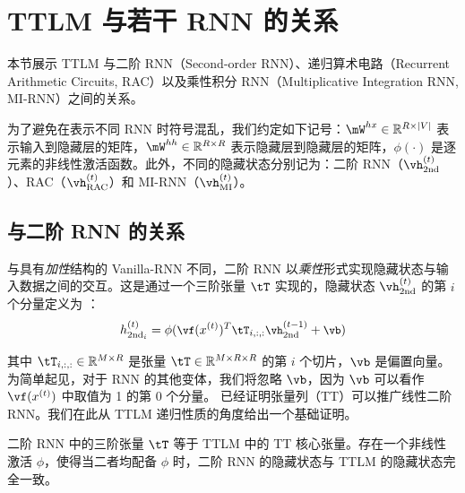 \section{TTLM 与若干 RNN 的关系}
\label{sec: TTLM generalization}

本节展示 TTLM 与二阶 RNN（Second-order RNN）、递归算术电路（Recurrent Arithmetic Circuits, RAC）以及乘性积分 RNN（Multiplicative Integration RNN, MI-RNN）之间的关系。

为了避免在表示不同 RNN 时符号混乱，我们约定如下记号：$\mW^{hx} \in \mathbb{R}^{R \times |V|}$ 表示输入到隐藏层的矩阵，$\mW^{hh} \in \mathbb{R}^{R \times R}$ 表示隐藏层到隐藏层的矩阵，$\phi(\cdot)$ 是逐元素的非线性激活函数。此外，不同的隐藏状态分别记为：二阶 RNN（$\vh^{(t)}_\textrm{2nd}$）、RAC（$\vh^{(t)}_\textrm{RAC}$）和 MI-RNN（$\vh^{(t)}_\textrm{MI}$）。


\subsection{与二阶 RNN 的关系}
\label{appendix: seecond}

与具有\textit{加性}结构的 Vanilla-RNN \citep{mikolov2012context} 不同，二阶 RNN 以\textit{乘性}形式实现隐藏状态与输入数据之间的交互。这是通过一个三阶张量 $\tT$ 实现的，隐藏状态 $\vh^{(t)}_\textrm{2nd}$ 的第 $i$ 个分量定义为 \citep{hochreiter1997long, maupome-meurs-2020-language}：
%
\begin{equation} \small
\label{eq: second-order-rnn}
h^{(t)}_{\textrm{2nd}_i}  = \phi(\vf(x^{(t)})^T \tT_{i, :, :}\vh^{(t-1)}_\textrm{2nd} + \vb)
\end{equation}
%

其中 $\tT_{i, :, :} \in\mathbb{R}^{M \times R}$ 是张量 $\tT\in\mathbb{R}^{M\times R \times R}$ 的第 $i$ 个切片，$\vb$ 是偏置向量。为简单起见，对于 RNN 的其他变体，我们将忽略 $\vb$，因为 $\vb$ 可以看作 $\vf (x^{(t)})$ 中取值为 1 的第 $0$ 个分量。\cite{rabusseau2019connecting} 已经证明张量列（TT）可以推广线性二阶 RNN。我们在此从 TTLM 递归性质的角度给出一个基础证明。

\begin{claim}
\label{cm: G and T}
二阶 RNN 中的三阶张量 $\tT$ 等于 TTLM 中的 TT 核心张量。存在一个非线性激活 $\phi$，使得当二者均配备 $\phi$ 时，二阶 RNN 的隐藏状态与 TTLM 的隐藏状态完全一致。
\end{claim}

